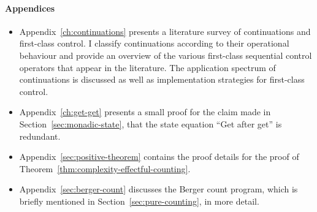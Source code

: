 \documentclass[12pt,phd,lfcs,twoside,openright,logo,leftchapter,normalheadings]{infthesis}
\theoremstyle{plain}
\theoremstyle{definition}
\begin{document}
\paragraph{Appendices}
\begin{itemize}

  \item Appendix~\ref{ch:continuations} presents a literature survey of
continuations and first-class control. I classify continuations
according to their operational behaviour and provide an overview of
the various first-class sequential control operators that appear in
the literature. The application spectrum of continuations is discussed
as well as implementation strategies for first-class control.

\item Appendix~\ref{ch:get-get} presents a small proof for the claim
  made in Section~\ref{sec:monadic-state}, that the state equation
  ``Get after get'' is redundant.


\item Appendix~\ref{sec:positive-theorem} contains the proof details
  for the proof of Theorem~\ref{thm:complexity-effectful-counting}.

\item Appendix~\ref{sec:berger-count} discusses the Berger count
  program, which is briefly mentioned in
  Section~\ref{sec:pure-counting}, in more detail.
\end{itemize}




\end{document}
